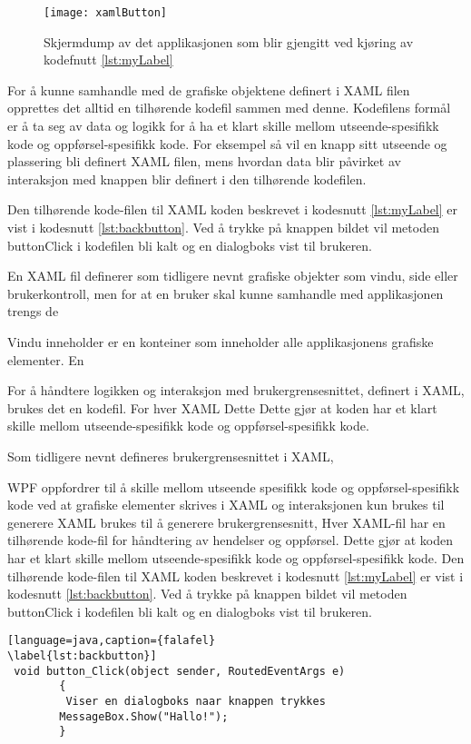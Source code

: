 \begin{figure}[ht!]
\centering
\texttt{[image: xamlButton]}
\caption{Skjermdump av det applikasjonen som blir gjengitt ved kjøring av kodefnutt \ref{lst:myLabel}}
\label{fig:xamlButton}
\end{figure}


For å kunne samhandle med de grafiske objektene definert i XAML filen opprettes det alltid en tilhørende kodefil sammen med denne. Kodefilens formål er å ta seg av data og logikk for å ha et klart skille mellom utseende-spesifikk kode og oppførsel-spesifikk kode. For eksempel så vil en knapp sitt utseende og plassering bli definert XAML filen, mens hvordan data blir påvirket av interaksjon med knappen blir definert i den tilhørende kodefilen.



Den tilhørende kode-filen til XAML koden beskrevet i kodesnutt \ref{lst:myLabel} er vist i kodesnutt \ref{lst:backbutton}. Ved å trykke på knappen bildet vil metoden button\textunderscore Click i kodefilen bli kalt og en dialogboks vist til brukeren.

En XAML fil definerer som tidligere nevnt grafiske objekter som vindu, side eller brukerkontroll, men for at en bruker skal kunne samhandle med applikasjonen trengs de


Vindu inneholder er en konteiner som inneholder alle applikasjonens grafiske elementer. En

For å håndtere logikken og interaksjon med brukergrensesnittet,  definert i XAML, brukes det en kodefil. For hver XAML   Dette Dette gjør at koden har et klart skille mellom utseende-spesifikk kode og oppførsel-spesifikk kode.

Som tidligere nevnt defineres brukergrensesnittet i XAML,

WPF oppfordrer til å skille mellom utseende spesifikk kode og oppførsel-spesifikk kode ved at grafiske elementer skrives i XAML og interaksjonen  kun brukes til generere 
XAML brukes til å generere brukergrensesnitt, 
Hver XAML-fil har en tilhørende kode-fil for håndtering av hendelser og oppførsel. Dette gjør at koden har et klart skille mellom utseende-spesifikk kode og oppførsel-spesifikk kode. Den tilhørende kode-filen til XAML koden beskrevet i kodesnutt \ref{lst:myLabel} er vist i kodesnutt \ref{lst:backbutton}. Ved å trykke på knappen bildet vil metoden button\textunderscore Click i kodefilen bli kalt og en dialogboks vist til brukeren.

\begin{lstlisting}[language=java,caption={falafel}
\label{lst:backbutton}]
 void button_Click(object sender, RoutedEventArgs e)
        {
         Viser en dialogboks naar knappen trykkes
        MessageBox.Show("Hallo!");
        }
\end{lstlisting}





